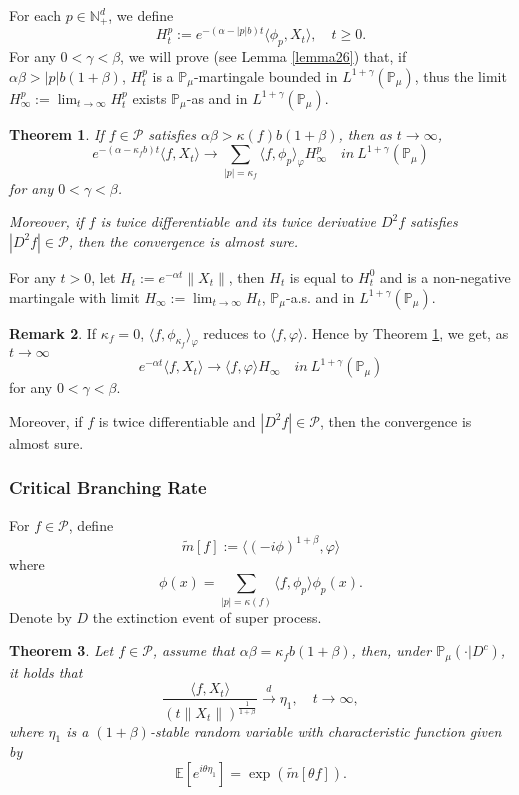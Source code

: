 \documentclass[12pt,oneside,english]{amsart}
\theoremstyle{plain}
\newtheorem{thm}{Theorem}[section]
\theoremstyle{definition}
\newtheorem{rem}[thm]{Remark}
\numberwithin{equation}{section}
\begin{document}
For each $p\in \mathbb{N}_+^d$, we define
$$H_t^p:= e^{-(\alpha-|p|b)t}\langle\phi_p,X_t\rangle,\quad t\geq 0.$$
  For any $0<\gamma<\beta$, we will prove (see Lemma \ref{lemma26}) that, if $\alpha\beta>|p|b(1+\beta)$, $H_t^p$ is a $\mathbb{P}_{\mu}$-martingale bounded in $L^{1+\gamma}(\mathbb{P}_{\mu})$, thus the limit $H^p_{\infty}:=\lim_{t\rightarrow \infty}H_t^p$ exists $\mathbb{P}_{\mu}$-as and in $L^{1+\gamma}(\mathbb{P}_{\mu})$.
 \begin{thm}\label{Theorem11}
     If $f \in \mathcal{P}$ satisfies $\alpha\beta>\kappa(f)b(1+\beta)$, then as $t\rightarrow \infty$,
     $$e^{-(\alpha-\kappa_fb)t}\langle f, X_t\rangle \rightarrow\sum_{|p|=\kappa_f}\langle f, \phi_p\rangle_{\varphi} H_{\infty}^p \quad in~ L^{1+\gamma}(\mathbb{P}_{\mu})$$
     for any $0<\gamma<\beta$.

     Moreover, if $f$ is twice differentiable and its twice derivative $D^2 f$ satisfies $|D^2 f| \in \mathcal{P}$, then the convergence is almost sure.
 \end{thm}
For any $t>0$, let $H_t:=e^{-\alpha t}\|X_t\|$, then $H_t$ is equal to $H_t^0$ and is a non-negative martingale with limit $H_{\infty}:=\lim_{t\rightarrow\infty}H_t$,  $\mathbb{P}_{\mu}$-a.s. and in $L^{1+\gamma}(\mathbb{P}_{\mu})$.
 \begin{rem}
    If $\kappa_f=0$, $\langle f, \phi_{\kappa_f}\rangle_{\varphi}$ reduces to $\langle f,\varphi\rangle$. Hence by Theorem \ref{Theorem11}, we get, as $t\rightarrow \infty$
     $$e^{-\alpha t}\langle f, X_t\rangle \rightarrow \langle f, \varphi\rangle H_{\infty} \quad in~ L^{1+\gamma}(\mathbb{P}_{\mu})$$
    for any $0<\gamma<\beta$.

    Moreover, if $f$ is twice differentiable and $|D^2 f| \in \mathcal{P}$, then the convergence is almost sure.
 \end{rem}

\subsubsection{Critical Branching Rate}
For $f\in \mathcal{P}$, define
$$\tilde{m}[f]:= \langle(-i\phi)^{1+\beta},\varphi\rangle$$
where
$$\phi(x)=\sum_{|p|=\kappa(f)}\langle f,\phi_p\rangle\phi_p(x).$$
Denote by $D$ the extinction event of super process.
\begin{thm}\label{Theorem12}
Let $f\in\mathcal{P}$, assume that  $\alpha\beta=\kappa_fb(1+\beta)$, then, under $\mathbb{P}_{\mu}(\cdot|D^c)$, it holds that
$$\frac{\langle f,X_t\rangle}{\left(t\|X_t\|\right)^{\frac{1}{1+\beta}}}\xrightarrow{d} \eta_1, \quad t\rightarrow \infty,$$
where $\eta_1$ is a $(1+\beta)$-stable random variable with characteristic function given by
$$\mathbb{E} [e^{i\theta \eta_1}]=\exp(\tilde{m}[\theta f]).$$
\end{thm}
\end{document}
